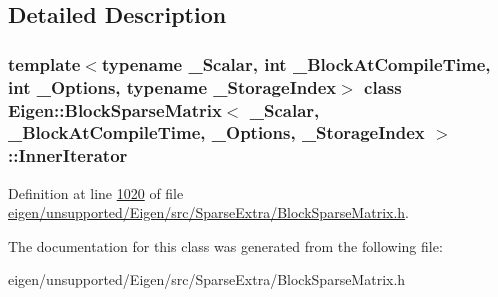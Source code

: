 \subsection{Detailed Description}
\subsubsection*{template$<$typename \+\_\+\+Scalar, int \+\_\+\+Block\+At\+Compile\+Time, int \+\_\+\+Options, typename \+\_\+\+Storage\+Index$>$\newline
class Eigen\+::\+Block\+Sparse\+Matrix$<$ \+\_\+\+Scalar, \+\_\+\+Block\+At\+Compile\+Time, \+\_\+\+Options, \+\_\+\+Storage\+Index $>$\+::\+Inner\+Iterator}



Definition at line \hyperlink{eigen_2unsupported_2_eigen_2src_2_sparse_extra_2_block_sparse_matrix_8h_source_l01020}{1020} of file \hyperlink{eigen_2unsupported_2_eigen_2src_2_sparse_extra_2_block_sparse_matrix_8h_source}{eigen/unsupported/\+Eigen/src/\+Sparse\+Extra/\+Block\+Sparse\+Matrix.\+h}.



The documentation for this class was generated from the following file\+:\begin{DoxyCompactItemize}
\item 
eigen/unsupported/\+Eigen/src/\+Sparse\+Extra/\+Block\+Sparse\+Matrix.\+h\end{DoxyCompactItemize}
